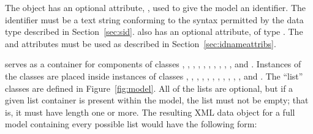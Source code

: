 The \Model object has an optional attribute, , used to
give the model an identifier.  The identifier must be a text
string conforming to the syntax permitted by the 
data type described in Section~\ref{sec:sid}.  \Model also has an
optional  attribute, of type .  The
 and  attributes must be used as described in
Section~\ref{sec:idnameattribs}.

\Model serves as a container for components of classes
\FunctionDefinition, \UnitDefinition, \CompartmentType,
\SpeciesType, \Compartment, \Species, \Parameter,
\InitialAssignment, \Rule, \Constraint, \Reaction and \Event.
Instances of the classes are placed inside instances of classes
\ListOfFunctionDefinitions, \ListOfUnitDefinitions,
\ListOfCompartmentTypes, \ListOfSpeciesTypes, \ListOfCompartments,
\ListOfSpecies, \ListOfParameters, \ListOfInitialAssignments,
\ListOfRules, \ListOfConstraints, \ListOfReactions, and
\ListOfEvents.  The ``list'' classes are defined in
Figure~\ref{fig:model}.  All of the lists are optional, but if a
given list container is present within the model, the list must
not be empty; that is, it must have length one or more.  The
resulting XML data object for a full model containing every
possible list would have the following form:

\newcommand{\sayOptional}{\raisebox{0pt}[0pt][0pt]{\bigg\} \textrm{\emph{optional}}}}


